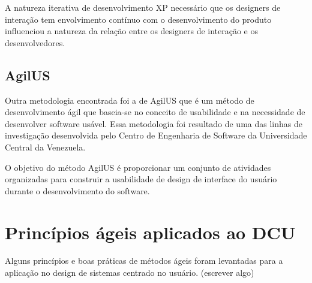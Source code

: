 	A natureza iterativa de desenvolvimento XP necessário que os designers de interação tem envolvimento contínuo com o desenvolvimento do produto influenciou a natureza da relação entre os designers de interação e os desenvolvedores.

	 


\subsection{AgilUS}

	Outra metodologia encontrada foi a de AgilUS que é um método de desenvolvimento ágil que baseia-se no conceito de usabilidade e na necessidade de desenvolver software usável. Essa metodologia foi resultado de uma das linhas de investigação desenvolvida pelo Centro de Engenharia de Software da Universidade Central da Venezuela.

	O objetivo do método AgilUS é proporcionar um conjunto de atividades organizadas para construir a usabilidade de design de interface do usuário durante o desenvolvimento do software.


\section{Princípios ágeis aplicados ao DCU}

	Alguns princípios e boas práticas de métodos ágeis foram levantadas para a aplicação no design de sistemas centrado no usuário. (escrever algo)

